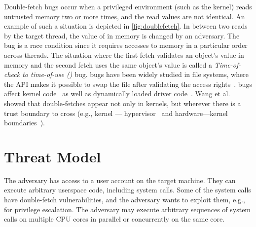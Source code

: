 \documentclass[letterpaper,twocolumn,10pt]{article}
\begin{document}
Double-fetch bugs occur when a privileged environment (such as the kernel)
reads untrusted memory two or more times, and the read values are not 
identical. 
An example of such a situation is depicted in \autoref{fig:doublefetch}.
In between two reads by the target thread, the value of  in memory 
is changed by an adversary.
The bug is a race condition since it requires accesses to memory in 
a particular order across threads.
The situation where the first fetch validates an object's value in memory and 
the second fetch uses the same object's value is called a 
\emph{Time-of-check to time-of-use (\tocttou)} bug.
\tocttou bugs have been widely studied in file systems, where the 
API makes it possible to swap the file after validating the access 
rights~\cite{payer2012protecting,
pu2006methodical, wei2010modeling, tsafrir2008portably,Garfinkel03}.
\tocttou bugs affect kernel code~\cite{jurczyk2013bochspwn, wang2018survey}
as well as dynamically loaded driver code~\cite{cve201812633,cve201812633fix}.
Wang et al.~\cite{wang2018survey} showed that double-fetches appear not only
in kernels, but wherever there is a trust boundary to cross (e.g., kernel ---
hypervisor~\cite{wilhelm2016xenpwn} and hardware---kernel
boundaries~\cite{lu2018untrusted}). 




\section{Threat Model}
\label{sec:threatmodel}

The adversary has access to a user account on the target machine. They can
execute arbitrary userspace code, including system calls. Some of the system 
calls have double-fetch vulnerabilities, and the adversary wants to exploit them,
e.g., for privilege escalation.
The adversary may execute arbitrary sequences of system calls on multiple CPU
cores in parallel or concurrently on the same core.
\end{document}

